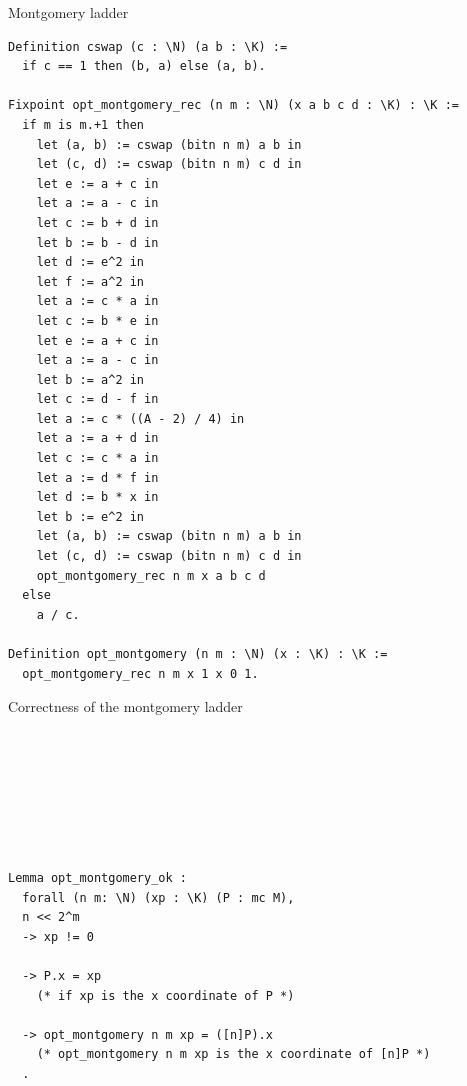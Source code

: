 \documentclass[8pt]{beamer}
\begin{document}
\begin{frame}[fragile]{Montgomery ladder}
\begin{center}
\begin{lstlisting}[language=Coq]
Definition cswap (c : \N) (a b : \K) :=
  if c == 1 then (b, a) else (a, b).

Fixpoint opt_montgomery_rec (n m : \N) (x a b c d : \K) : \K :=
  if m is m.+1 then
    let (a, b) := cswap (bitn n m) a b in
    let (c, d) := cswap (bitn n m) c d in
    let e := a + c in
    let a := a - c in
    let c := b + d in
    let b := b - d in
    let d := e^2 in
    let f := a^2 in
    let a := c * a in
    let c := b * e in
    let e := a + c in
    let a := a - c in
    let b := a^2 in
    let c := d - f in
    let a := c * ((A - 2) / 4) in
    let a := a + d in
    let c := c * a in
    let a := d * f in
    let d := b * x in
    let b := e^2 in
    let (a, b) := cswap (bitn n m) a b in
    let (c, d) := cswap (bitn n m) c d in
    opt_montgomery_rec n m x a b c d
  else
    a / c.

Definition opt_montgomery (n m : \N) (x : \K) : \K :=
  opt_montgomery_rec n m x 1 x 0 1.
\end{lstlisting}
\end{center}
\end{frame}

%
%

\begin{frame}[fragile]{Correctness of the montgomery ladder}
\begin{center}
\begin{lstlisting}[language=Coq, basicstyle=\large]







Lemma opt_montgomery_ok :
  forall (n m: \N) (xp : \K) (P : mc M),
  n << 2^m
  -> xp != 0

  -> P.x = xp
    (* if xp is the x coordinate of P *)

  -> opt_montgomery n m xp = ([n]P).x
    (* opt_montgomery n m xp is the x coordinate of [n]P *)
  .
\end{lstlisting}
\end{center}
\end{frame}

%
%
\end{document}
